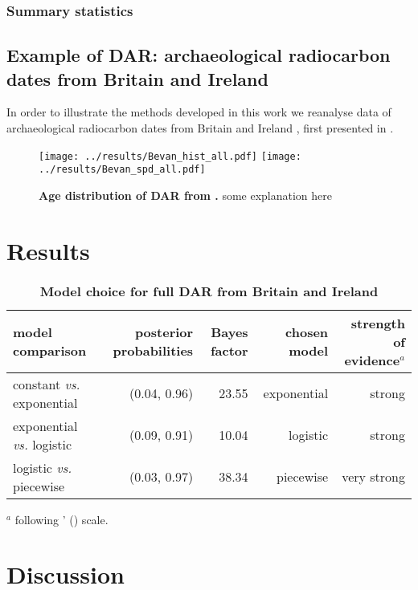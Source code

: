 \documentclass[a4paper]{article}
\begin{document}
\subsubsection*{Summary statistics}





\subsection*{Example of DAR: archaeological radiocarbon dates from Britain and Ireland}

In order to illustrate the methods developed in this work we reanalyse data of archaeological radiocarbon dates from Britain and Ireland \parencite{Bevan2017b}, first presented in \textcite{Bevan2017}. 




\begin{figure}
\center\texttt{[image: ../results/Bevan\_hist\_all.pdf]}
\center\texttt{[image: ../results/Bevan\_spd\_all.pdf]}
\caption{\textbf{Age distribution of DAR from \textcite{Bevan2017}.} some explanation here}
\label{fig:data}
\end{figure}


\section*{\centering Results}

\begin{table}[tbh]
\caption{\textbf{Model choice for full DAR from Britain and Ireland}}
\label{tab:model_choice}
\begin{tabular}{lrrrr}
\hline
model comparison & posterior probabilities & Bayes factor & chosen model & strength of evidence$^a$ \\
\hline\hline
constant \textit{vs.} exponential & (0.04, 0.96) & 23.55 & exponential & strong \\
exponential \textit{vs.} logistic & (0.09, 0.91) & 10.04 & logistic & strong \\
logistic \textit{vs.} piecewise & (0.03, 0.97) & 38.34 & piecewise & very strong \\
\hline
\end{tabular}
\footnotesize{$^a$ following \citeauthor{Jeffreys1961}' (\citeyear{Jeffreys1961}) scale.}\\
\end{table}


\section*{\centering Discussion}
\end{document}
